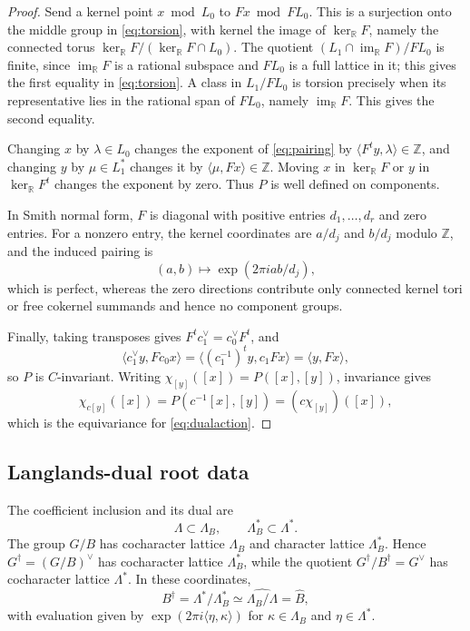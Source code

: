 \documentclass[11pt,a4paper,reqno]{amsart}
\theoremstyle{plain}
\theoremstyle{definition}
\theoremstyle{remark}
\numberwithin{equation}{section}
\DeclareMathOperator{\im}{im}
\newcommand{\ZZ}{\mathbb Z}
\newcommand{\RR}{\mathbb R}
\newcommand{\pair}[2]{\langle #1,#2\rangle}
\newcommand{\eexp}[1]{\exp(2\pi i #1)}
\begin{document}
\begin{proof}
Send a kernel point $x\bmod L_0$ to $Fx\bmod FL_0$. This is a surjection onto the middle group in \eqref{eq:torsion}, with kernel the image of $\ker_{\RR} F$, namely the connected torus $\ker_{\RR} F/(\ker_{\RR} F\cap L_0)$. The quotient $(L_1\cap\im_{\RR} F)/FL_0$ is finite, since $\im_{\RR} F$ is a rational subspace and $FL_0$ is a full lattice in it; this gives the first equality in \eqref{eq:torsion}. A class in $L_1/FL_0$ is torsion precisely when its representative lies in the rational span of $FL_0$, namely $\im_{\RR} F$. This gives the second equality.

Changing $x$ by $\lambda\in L_0$ changes the exponent of \eqref{eq:pairing} by $\pair{F^ty}{\lambda}\in\ZZ$, and changing $y$ by $\mu\in L_1^*$ changes it by $\pair{\mu}{Fx}\in\ZZ$. Moving $x$ in $\ker_{\RR} F$ or $y$ in $\ker_{\RR} F^t$ changes the exponent by zero. Thus $P$ is well defined on components.

In Smith normal form, $F$ is diagonal with positive entries $d_1,\ldots,d_r$ and zero entries. For a nonzero entry, the kernel coordinates are $a/d_j$ and $b/d_j$ modulo $\ZZ$, and the induced pairing is
\[
(a,b)\longmapsto\eexp{ab/d_j},
\]
which is perfect, whereas the zero directions contribute only connected kernel tori or free cokernel summands and hence no component groups.

Finally, taking transposes gives $F^t c_1^\vee=c_0^\vee F^t$, and
\[
\pair{c_1^\vee y}{F c_0x} =\pair{(c_1^{-1})^t y}{c_1Fx} =\pair{y}{Fx},
\]
so $P$ is $C$-invariant. Writing $\chi_{[y]}([x])=P([x],[y])$, invariance gives
\[
\chi_{c[y]}([x])=P(c^{-1}[x],[y])=(c\chi_{[y]})([x]),
\]
which is the equivariance for \eqref{eq:dualaction}.
\end{proof}

\subsection{Langlands-dual root data}

The coefficient inclusion and its dual are
\begin{equation}\label{eq:duallattices}
\Lambda\subset\Lambda_B,\qquad \Lambda_B^*\subset\Lambda^*.
\end{equation}
The group $G/B$ has cocharacter lattice $\Lambda_B$ and character lattice $\Lambda_B^*$. Hence $G^\dagger=(G/B)^\vee$ has cocharacter lattice $\Lambda_B^*$, while the quotient $G^\dagger/B^\dagger=G^\vee$ has cocharacter lattice $\Lambda^*$. In these coordinates,
\[
B^\dagger=\Lambda^*/\Lambda_B^*\simeq\widehat{\Lambda_B/\Lambda}=\widehat B,
\]
with evaluation given by $\eexp{\pair{\eta}{\kappa}}$ for $\kappa\in\Lambda_B$ and $\eta\in\Lambda^*$.
\end{document}
